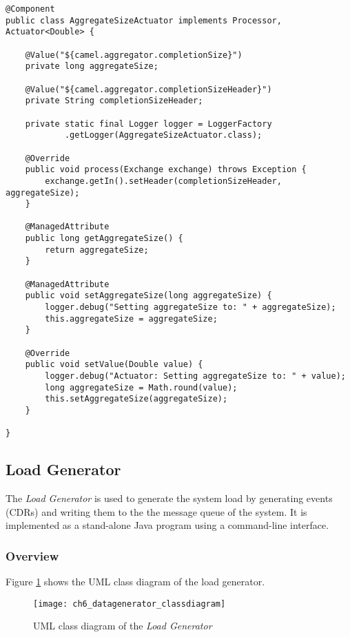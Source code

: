 \begin{lstlisting}[caption={AggregateSizeActuator},label=listing:ch5_aggregateSizeActuator]
@Component
public class AggregateSizeActuator implements Processor, Actuator<Double> {

	@Value("${camel.aggregator.completionSize}")
	private long aggregateSize;
	
	@Value("${camel.aggregator.completionSizeHeader}")
	private String completionSizeHeader;
	
	private static final Logger logger = LoggerFactory
			.getLogger(AggregateSizeActuator.class);
	
	@Override
	public void process(Exchange exchange) throws Exception {
		exchange.getIn().setHeader(completionSizeHeader, aggregateSize);
	}

	@ManagedAttribute
	public long getAggregateSize() {
		return aggregateSize;
	}

	@ManagedAttribute
	public void setAggregateSize(long aggregateSize) {
		logger.debug("Setting aggregateSize to: " + aggregateSize);
		this.aggregateSize = aggregateSize;
	}

	@Override
	public void setValue(Double value) {
		logger.debug("Actuator: Setting aggregateSize to: " + value);
		long aggregateSize = Math.round(value);
		this.setAggregateSize(aggregateSize);
	}

}

\end{lstlisting}

\subsection{Load Generator}

The \emph{Load Generator} is used to generate the system load by generating events (\acp{CDR}) and writing them to the the message queue of the system. It is implemented as a stand-alone Java program using a command-line interface.

\subsubsection{Overview}

Figure \ref{fig:ch5_datagenerator_classdiagram} shows the \ac{UML} class diagram of the load generator.

\begin{figure}[htpb]
	\centering
	\texttt{[image: ch6\_datagenerator\_classdiagram]}
	\caption{\ac{UML} class diagram of the \emph{Load Generator}}
	\label{fig:ch5_datagenerator_classdiagram}
\end{figure}

